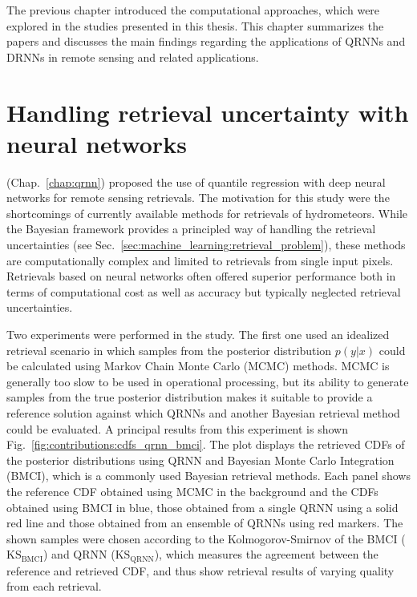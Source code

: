 
The previous chapter introduced the computational approaches, which were
explored in the studies presented in this thesis. This chapter summarizes
the papers and discusses the main findings regarding the applications of
QRNNs and DRNNs in remote sensing and related applications.

\section{Handling retrieval uncertainty with neural networks}

\citet{pfreundschuh18} (Chap.~\ref{chap:qrnn}) proposed the use of quantile
regression with deep neural networks for remote sensing retrievals. The
motivation for this study were the shortcomings of currently available methods
for retrievals of hydrometeors. While the Bayesian framework provides a
principled way of handling the retrieval uncertainties (see
Sec.~\ref{sec:machine_learning:retrieval_problem}), these methods are
computationally complex and limited to retrievals from single input pixels.
Retrievals based on neural networks often offered superior performance both in
terms of computational cost as well as accuracy but typically neglected
retrieval uncertainties.

Two experiments were performed in the study. The first one used an idealized
retrieval scenario in which samples from the posterior distribution $p(y|x)$
could be calculated using Markov Chain Monte Carlo (MCMC) methods. MCMC is
generally too slow to be used in operational processing, but its ability to
generate samples from the true posterior distribution makes it suitable to
provide a reference solution against which QRNNs and another Bayesian retrieval
method could be evaluated. A principal results from this experiment is shown
Fig.~\ref{fig:contributions:cdfs_qrnn_bmci}. The plot displays the retrieved
CDFs of the posterior distributions using QRNN and Bayesian Monte Carlo
Integration (BMCI), which is a commonly used Bayesian retrieval methods. Each
panel shows the reference CDF obtained using MCMC in the background and the CDFs
obtained using BMCI in blue, those obtained from a single QRNN using a solid red
line and those obtained from an ensemble of QRNNs using red markers. The shown
samples were chosen according to the Kolmogorov-Smirnov of the BMCI
($\text{KS}_\text{BMCI}$) and QRNN ($\text{KS}_\text{QRNN}$), which measures
the agreement between the reference and retrieved CDF, and thus show retrieval
results of varying quality from each retrieval.

